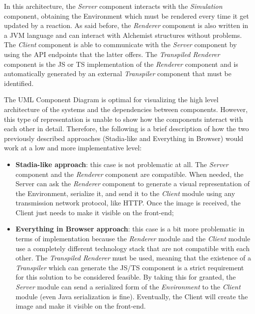 
In this architecture, the \textit{Server} component interacts with the \textit{Simulation} component, obtaining the Environment which must be rendered every time it get updated by a reaction. As said before, the \textit{Renderer} component is also written in a JVM language and can interact with Alchemist structures without problems. The \textit{Client} component is able to communicate with the \textit{Server} component by using the API endpoints that the latter offers. The \textit{Transpiled Renderer} component is the JS or TS implementation of the \textit{Renderer} component and is automatically generated by an external \textit{Transpiler} component that must be identified.\newline

The UML Component Diagram is optimal for visualizing the high level architecture of the systems and the dependencies between components. However, this type of representation is unable to show how the components interact with each other in detail. Therefore, the following is a brief description of how the two previously described approaches (Stadia-like and Everything in Browser) would work at a low and more implementative level:
\begin{itemize}
	\item \textbf{Stadia-like approach}: this case is not problematic at all. The \textit{Server} component and the \textit{Renderer} component are compatible. When needed, the Server can ask the \textit{Renderer} component to generate a visual representation of the Environment, serialize it, and send it to the \textit{Client} module using any transmission network protocol, like HTTP. Once the image is received, the Client just needs to make it visible on the front-end;
	\item \textbf{Everything in Browser approach}: this case is a bit more problematic in terms of implementation because the \textit{Renderer} module and the \textit{Client} module use a completely different technology stack that are not compatible with each other. The \textit{Transpiled Renderer} must be used, meaning that the existence of a \textit{Transpiler} which can generate the JS/TS component is a strict requirement for this solution to be considered feasible.
	By taking this for granted, the \textit{Server} module can send a serialized form of the \textit{Environment} to the \textit{Client} module (even Java serialization is fine). Eventually, the Client will create the image and make it visible on the front-end.
\end{itemize}
